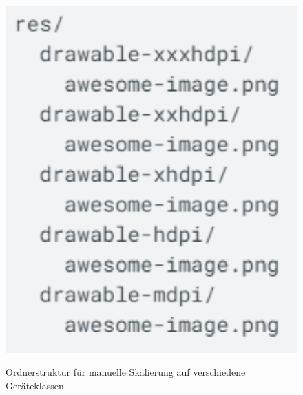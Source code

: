 \begin{figure}[hbt]
    \centering
    \begin{minipage}[t]{.4\textwidth}
        \caption[]{Ordnerstruktur für manuelle Skalierung auf verschiedene Geräteklassen}
        \includegraphics[width=1\textwidth]{img/DIP_Folder_Structure.PNG}\\
        \label{fig:android_dip_folder_structure}
    \end{minipage}
\end{figure}

